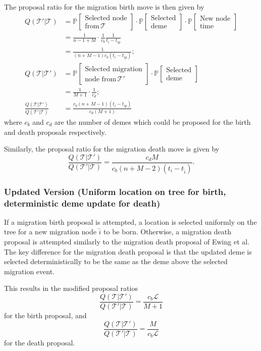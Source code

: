 \documentclass[12pt,a4paper]{article}
\newcommand{\calL}{\mathcal{L}}
\newcommand{\calT}{\mathcal{T}}
\newcommand{\bbP}{\mathbb{P}}
\begin{document}
				The proposal ratio for the migration birth move is then given by
					\begin{align*}
						Q( \calT' | \calT) & = \bbP \left[ \substack{\text{Selected node} \\ \text{from} \, \calT} \right] \cdot \bbP[\substack{\text{Selected}\\ \text{deme}}] \cdot \bbP[\substack{\text{New node} \\ \text{time}}] \\
							& = \frac{1}{n-1+M} \cdot \frac{1}{c_b} \frac{1}{t_i - t_{ip}} \\
							& = \frac{1}{(n+M-1)c_b (t_i - t_{ip})}; \\[1ex]
						Q(\calT | \calT') & = \bbP[\substack{\text{Selected migration} \\ \text{node from} \, \calT'}] \cdot \bbP[\substack{\text{Selected} \\ \text{deme}}] \\
							& = \frac{1}{M+1} \cdot \frac{1}{c_d}; \\
						\frac{Q(\calT | \calT')}{Q(\calT' | \calT)} & = \frac{c_b (n+M-1) (t_i - t_{ip})}{c_d(M+1)}
					\end{align*}
				where $c_b$ and $c_d$ are the number of demes which could be proposed for the birth and death proposals respectively.
				
				Similarly, the proposal ratio for the migration death move is given by
					\[
						\frac{Q(\calT | \calT')}{Q(\calT' | \calT)} = \frac{c_d M}{c_b (n+M - 2) (t_i -t_{\hat{i}})}.
					\]
				
		\subsubsection{Updated Version (Uniform location on tree for birth, deterministic deme update for death)}
			If a migration birth proposal is attempted, a location is selected uniformly on the tree for a new migration node $\hat{i}$ to be born. Otherwise, a migration death proposal is attempted similarly to the migration death proposal of Ewing et al. The key difference for the migration death proposal is that the updated deme is selected deterministically to be the same as the deme above the selected migration event.
			
			This results in the modified proposal ratios
				\[
					\frac{Q(\calT | \calT')}{Q(\calT' | \calT)} = \frac{c_b \calL}{M+1}
				\]
			for the birth proposal, and
				\[
					\frac{Q(\calT | \calT')}{Q(\calT' | \calT)} = \frac{M}{c_b \calL}
				\]
			for the death proposal.
\end{document}
